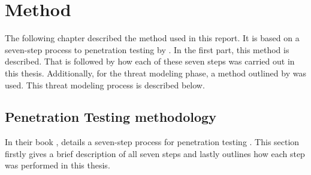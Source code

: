 \chapter{Method} \label{ch:method}
The following chapter described the method used in this report. It is based on a seven-step process to penetration testing by \textcite{weidman2014}. In the first part, this method is described. That is followed by how each of these seven steps was carried out in this thesis. Additionally, for the threat modeling phase, a method outlined by \textcite{guzman2017iot} was used. This threat modeling process is described below.

\section{Penetration Testing methodology} 
In their book , \citeauthor{weidman2014} details a seven-step process for penetration testing \cite{weidman2014}. This section firstly gives a brief description of all seven steps and lastly outlines how each step was performed in this thesis.

